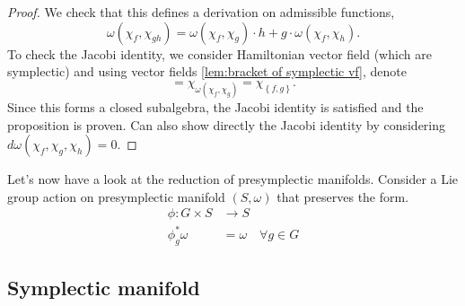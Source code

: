 \begin{proof}
    We check that this defines a derivation on admissible functions,
    \begin{equation}
        \omega(\chi_f, \chi_{gh}) = \omega(\chi_f, \chi_g)\cdot h + g \cdot \omega(\chi_f, \chi_h).
    \end{equation}
    To check the Jacobi identity, we consider Hamiltonian vector field (which are symplectic) and using vector fields \cref{lem:bracket of symplectic vf}, denote
    \begin{equation}
        [\chi_f, \chi_g] = \chi_{\omega(\chi_f, \chi_g)} = \chi_{\left\{ f,g \right\}}.
    \end{equation}
    Since this forms a closed subalgebra, the Jacobi identity is satisfied and the proposition is proven. Can also show directly the Jacobi identity by considering
    $d \omega(\chi_f, \chi_g, \chi_h) = 0$.
\end{proof}
% 
\label{def:Isotropic presymplectic submanifold}

Let's now have a look at the reduction of presymplectic manifolds.
Consider a Lie group action on presymplectic manifold $(S,\omega)$ that preserves the form.
\begin{align}
    \phi : G \times S &\rightarrow S\\
    \phi^*_g \omega &= \omega \quad \forall g \in G
\end{align}

\subsection{Symplectic manifold} %
\label{sub:symplectic_mfd}

% 
\label{def:symplectic map}
% 
\label{def:lagrangian relations}
% 
\label{def:weinstein category}
